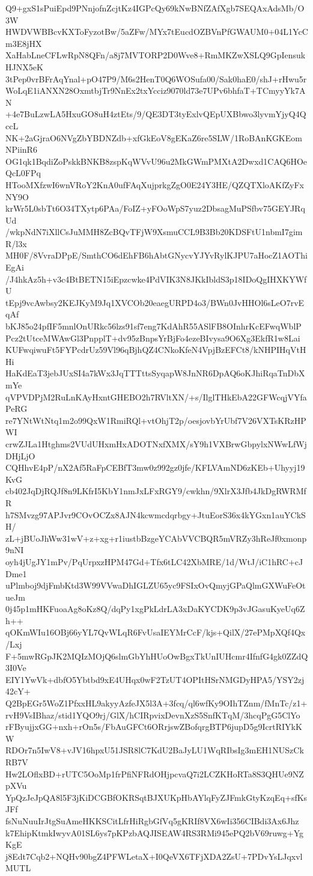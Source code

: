 Q9+gxS1sPuiEpd9PNnjofnZcjtKz4IGPcQy69kNwBNfZAfXgb7SEQAxAdsMb/O3W
HWDVWBBcvKXToFyzotBw/5aZFw/MYx7tEucdOZBVnPfGWAUM0+04L1YcCm3E8jHX
XaHabLneCFLwRpN8QFn/a8j7MVTORP2D0Wve8+RmMKZwXSLQ9GpIensukHJNX5eK
3tPep0vrBFrAqYnal+pO47P9/M6s2HenT0Q6WOSufa00/Sak0haE0/shJ+rHwu5r
WoLqE1iANXN28OxmtbjTr9NnEx2txYcciz9070ld73e7UPv6bhfaT+TCmyyYk7AN
+4e7BuLzwLA5HxuGO8uH4ztEts/9/QE3DT3tyExlvQEpUXBbwo3lyvmYjyQ4QccL
NK+2aGjraO6NVgZbYBDNZdb+xfGkEoV8gEKaZ6re5SLW/1RoBAnKGKEomNPiinR6
OG1qk1BqdiZoPskkBNKB8zspKqWVvU96u2MkGWmPMXtA2Dwxd1CAQ6HOeQcL0FPq
HTooMXfzwI6wnVRoY2KnA0ufFAqXujprkgZgO0E24Y3HE/QZQTXloAKfZyFxNY9O
krWr5L0sbTt6O34TXytp6PAa/FoIZ+yFOoWpS7yuz2DbsagMuPSfbv75GEYJRqUd
/wkpNdN7iXllCsJuMMH8ZcBQvTFjW9XsmuCCL9B3Bb20KDSFtU1nbmI7gimR/l3x
MH0F/8VvraDPpE/SmthCO6dEhFB6hAbtGNycvYJYvRylKJPU7aHocZ1AOThiEgAi
/J4hkAz5h+v3c4BtBETN15iEpzcwke4PdVIK3N8JKkIbldS3p18IDoQgIHXKYWfU
tEpj9vcAwbsy2KEJKyM9Jq1XVCOb20eaegURPD4o3/BWn0JvHHOl6sLeO7rvEqAf
bKJ85o24pfIF5mnlOnURkc56lzs91sf7eng7KdAhR55ASlFB8OInhrKcEFwqWblP
Pcz2tUtceMWAwGl3PnpplT+dv95zBnpsYrBjFo4ezeBIvysa9O6Xg3EkfR1w8Lai
KUFwqiwuFt5FYPcdrUz59Vl96qBjhQZ4CNkoKfeN4VpjBzEFCt8/kNHPIHqVtHHi
HaKdEaT3jebJUxSI4a7kWx3JqTTTttsSyqapW8JnNR6DpAQ6oKJhiRqaTnDbXmYe
qVPVDPjM2RuLnKAyHxntGHEBO2h7RVltXN/+s/IlglTHkEbA22GFWcqjVYfaPeRG
re7YNtWtNtq1m2o99QxW1RmiRQl+vtOhjT2p/oesjovbYrUbf7V26VXTsKRzHPWI
crwZJLa1Htghms2VUdUHxmHxADOTNxfXMX/sY9h1VXBrwGbpylxNWwLfWjDHjLjO
CQHhvE4pP/nX2Af5RaFpCEBfT3mw0z992gz0jfe/KFLVAmND6zKEb+Uhyyj19KvG
cb402JqDjRQJf8n9LKfrI5KbY1nmJxLFxRGY9/cwkhn/9XlrX3Jfb4JkDgRWRMfR
h7SMvzg97APJvr9COvOCZx8AJN4kcwmcdqrbgy+JtuEorS36x4kYGxn1auYCkSH/
zL+jBUoJhWw31wV+z+xg+r1iustbBzgeYCAbVVCBQR5mVRZy3hReJf0xmonp9nNI
oyh4jUgJY1mPv/PqUrpxzHPM47Gd+Tfx6tLC42XbMRE/1d/WtJ/iC1hRC+cJDme1
uPlmboj9djFmbKtd3W99VVwaDhIGLZU65yc9FSIxOvQmyjGPaQlmGXWuFeOtueJm
0j45p1mHKFuoaAg8oKz8Q/dqPy1xgPkLdrLA3xDaKYCDK9p3vJGasuKyeUq6Zh++
qOKmWIu16OBj66yYL7QvWLqR6FvUsaIEYMrCcF/kjs+QilX/27ePMpXQf4Qx/Lxj
F+5mwRGpJK2MQIzMOjQ6slmGbYhHUoOwBgxTkUnIUHcmr4IfnfG4gk0ZZdQ3I0Ve
EIY1YwVk+dbfO5Ybtbd9xE4UHqx0wF2TzUT4OPItHSrNMGDyHPA5/YSY2zj42cY+
Q2BpEGr5WoZ1PfxxHL9akyyAzfeJX5l3A+3fcq/ql6wfKy9OIhTZnm/fMnTc/z1+
rvH9VsIBhaz/stid1YQO9rj/GlX/hCIRpvixDevnXzS5SnfKTqM/3hcqPgG5ClYo
rFByujjxGG+nxh+rOn5s/FbAuGFCt6ORrjswZBofqrgBTP6jupD5g9IcrtRIYkKW
RDOr7n5IwV8+vJV16hpxU51JSR8lC7KdU2BaJyLU1WqRIbsIg3mEH1NUSzCkRB7V
Hw2LOflxBD+rUTC5OoMp1frPfiNFRdOHjpcvaQ7i2LCZKHoRTa8S3QHUe9NZpXVu
YpQzJeJpQA8l5F3jKiDCGBfOKRSqtBJXUKpHbAYlqFyZJFmkGtyKzqEq+sfKsJFf
fsNuNuuIrJtgSuAmeHKKSCitLfrHiRgbGfVq5gKRIf8VX6wIi356CIBdi3Ax6Jhz
k7EhipKtmkIwyvA01SL6ys7pKPzbAQJISEAW4RS3RMi945ePQ2bV69ruwg+YgKgE
j8Edt7Cqb2+NQHv90bgZ4PFWLetaX+I0QeVX6TFjXDA2ZsU+7PDvYsLJqxvlMUTL
